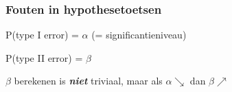 \documentclass[aspectratio=169]{beamer}
\begin{document}
\begin{frame}
  \frametitle{Fouten in hypothesetoetsen}
  
  \begin{table}
    \centering
    \label{tab:hypfouten}
  \end{table}
  
  P(type I error) = $\alpha$ (= significantieniveau)
  
  P(type II error) = $\beta$
  
  $\beta$ berekenen is \textbf{\textit{niet}} triviaal, maar als $\alpha \searrow$ dan $\beta \nearrow$ 
\end{frame}
\end{document}
